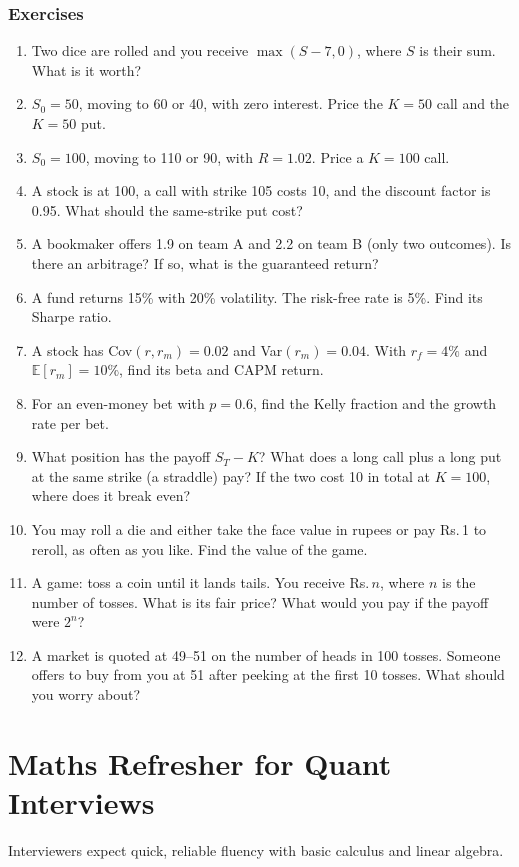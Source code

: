 \documentclass[11pt,a4paper,openany]{report}
\newenvironment{exercises}{\subsection*{Exercises \thechapter}\begin{enumerate}[label=\textbf{\thechapter.\arabic*},leftmargin=3.2em]}{\end{enumerate}}
\newcommand{\Rs}{Rs.\,}
\newcommand{\E}{\mathbb{E}}
\begin{document}
\begin{exercises}
\item Two dice are rolled and you receive $\max(S-7,0)$, where $S$ is their sum. What is it worth?
\item $S_0=50$, moving to 60 or 40, with zero interest. Price the $K=50$ call and the $K=50$ put.
\item $S_0=100$, moving to 110 or 90, with $R=1.02$. Price a $K=100$ call.
\item A stock is at 100, a call with strike 105 costs 10, and the discount factor is 0.95. What should the same-strike put cost?
\item A bookmaker offers 1.9 on team A and 2.2 on team B (only two outcomes). Is there an arbitrage? If so, what is the guaranteed return?
\item A fund returns 15\% with 20\% volatility. The risk-free rate is 5\%. Find its Sharpe ratio.
\item A stock has Cov$(r,r_m)=0.02$ and Var$(r_m)=0.04$. With $r_f=4\%$ and $\E[r_m]=10\%$, find its beta and CAPM return.
\item For an even-money bet with $p=0.6$, find the Kelly fraction and the growth rate per bet.
\item What position has the payoff $S_T-K$? What does a long call plus a long put at the same strike (a straddle) pay? If the two cost 10 in total at $K=100$, where does it break even?
\item You may roll a die and either take the face value in rupees or pay \Rs1 to reroll, as often as you like. Find the value of the game.
\item A game: toss a coin until it lands tails. You receive \Rs$n$, where $n$ is the number of tosses. What is its fair price? What would you pay if the payoff were $2^n$?
\item A market is quoted at 49--51 on the number of heads in 100 tosses. Someone offers to buy from you at 51 after peeking at the first 10 tosses. What should you worry about?
\end{exercises}

\chapter{Maths Refresher for Quant Interviews}\label{ch:mathref}

Interviewers expect quick, reliable fluency with basic calculus and linear algebra.
\end{document}
